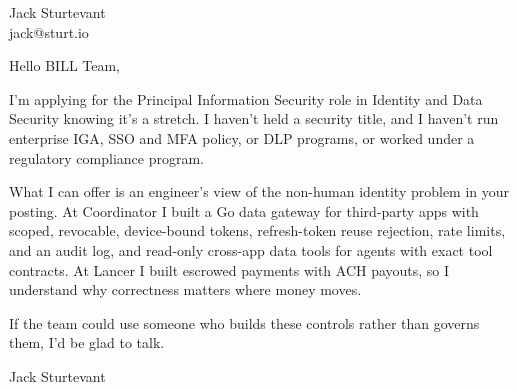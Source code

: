 \documentclass[11pt]{article}
\begin{document}
\raggedright

{\namefont\fontsize{20pt}{24pt}\selectfont Jack Sturtevant}\\[-0.3em]
jack@sturt.io

\vspace{1.2em}

Hello BILL Team,

I'm applying for the Principal Information Security role in Identity and Data Security knowing it's a stretch. I haven't held a security title, and I haven't run enterprise IGA, SSO and MFA policy, or DLP programs, or worked under a regulatory compliance program.

What I can offer is an engineer's view of the non-human identity problem in your posting. At Coordinator I built a Go data gateway for third-party apps with scoped, revocable, device-bound tokens, refresh-token reuse rejection, rate limits, and an audit log, and read-only cross-app data tools for agents with exact tool contracts. At Lancer I built escrowed payments with ACH payouts, so I understand why correctness matters where money moves.

If the team could use someone who builds these controls rather than governs them, I'd be glad to talk.

\vspace{0.6em}
Jack Sturtevant
\end{document}
